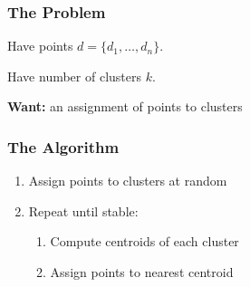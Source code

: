 
\begin{frame}
  \vspace{-4.5cm}
\end{frame}




\begin{frame}
  \frametitle{The Problem}
  Have points $d = \{d_1, \dotsc, d_n\}$.

  Have number of clusters $k$.

  \vspace{5mm}
  \textbf{Want:} an assignment of points to clusters
\end{frame}

\begin{frame}
\end{frame}

\begin{frame}
\end{frame}

\begin{frame}
\end{frame}

\begin{frame}
\end{frame}

\begin{frame}
  \frametitle{The Algorithm}
  \begin{enumerate}
  \item Assign points to clusters at random
  \item Repeat until stable:
  \begin{enumerate}
  \item Compute centroids of each cluster
  \item Assign points to nearest centroid
  \end{enumerate}
  \end{enumerate}
\end{frame}


